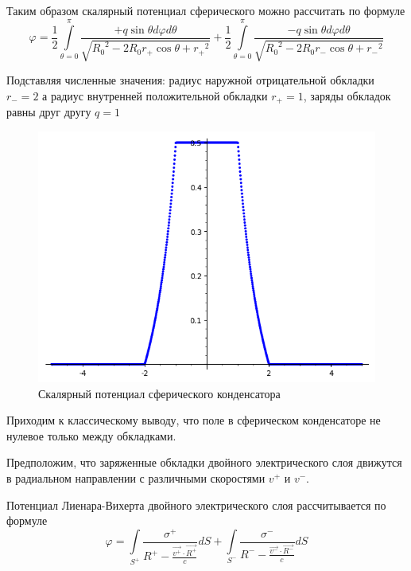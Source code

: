 \documentclass[12pt]{article}
\begin{document}
Таким образом скалярный потенциал сферического можно рассчитать по формуле
	\[\varphi =\frac{1}{2}\int\limits_{\theta =0}^{\pi }{\frac{+q\sin \theta d\varphi d\theta }{\sqrt{{{R}_{0}}^{2}-2{{R}_{0}}{{r}_{+}}\cos \theta +{{r}_{+}}^{2}}}}+\frac{1}{2}\int\limits_{\theta =0}^{\pi }{\frac{-q\sin \theta d\varphi d\theta }{\sqrt{{{R}_{0}}^{2}-2{{R}_{0}}{{r}_{-}}\cos \theta +{{r}_{-}}^{2}}}}\]

Подставляя численные значения: радиус наружной отрицательной обкладки ${{r}_{-}}=2$ а радиус внутренней положительной обкладки ${{r}_{+}}=1$, заряды обкладок равны друг другу $q=1$

\begin{figure}
    \centering
    \includegraphics[scale=0.3]{spherical_capascitor_phi_Rneg=2_Rpos=1}
    \caption{Скалярный потенциал сферического конденсатора}
    \label{fig:spherical_capascitor_phi_Rneg=2_Rpos=1}
\end{figure}

Приходим к классическому выводу, что поле в сферическом конденсаторе не нулевое только между обкладками.

Предположим, что заряженные обкладки двойного электрического слоя движутся в радиальном направлении с различными скоростями ${{v}^{+}}$ и ${{v}^{-}}$. 

Потенциал Лиенара-Вихерта двойного электрического слоя рассчитывается по формуле
	\[\varphi =\int\limits_{{{S}^{+}}}{\frac{{{\sigma }^{+}}}{{{R}^{+}}-\frac{\overrightarrow{{{v}^{+}}}\cdot \overrightarrow{{{R}^{+}}}}{c}}dS+}\int\limits_{{{S}^{-}}}{\frac{{{\sigma }^{-}}}{{{R}^{-}}-\frac{\overrightarrow{{{v}^{-}}}\cdot \overrightarrow{{{R}^{-}}}}{c}}dS}\] 	
\end{document}
